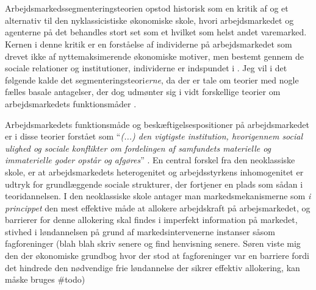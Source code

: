 \section{ \label{AST_overordnet}}

Arbejdsmarkedssegmenteringsteorien opstod historisk som en kritik af og et alternativ til den nyklassicistiske økonomiske skole, hvori arbejdsmarkedet og agenterne på det behandles stort set som et hvilket som helst andet varemarked. Kernen i denne kritik er en forståelse af individerne på arbejdsmarkedet som drevet ikke af nyttemaksimerende økonomiske motiver, men bestemt gennem de sociale relationer og institutioner, individerne er indspundet i \parencite[173]{Boje1986}. Jeg vil i det følgende kalde det segmenteringsteori\emph{erne}, da der er tale om teorier med nogle fælles basale antagelser, der dog udmønter sig i vidt forskellige teorier om arbejdsmarkedets funktionsmåder \parencite[177]{Edwards1979}. 


Arbejdsmarkedets funktionsmåde og beskæftigelsespositioner på arbejdsmarkedet er i disse teorier forstået som “\emph{(...) den vigtigste institution, hvorigennem social ulighed og sociale konflikter om fordelingen af samfundets materielle og immaterielle goder opstår og afgøres}” \parencite[10]{Boje1985}. 
En central forskel fra den neoklassiske skole, er at arbejdsmarkedets heterogenitet og arbejdsstyrkens inhomogenitet er udtryk for grundlæggende sociale strukturer, der fortjener en plads som sådan i teoridannelsen. I den neoklassiske skole antager man markedsmekanismerne som \emph{i princippet} den mest effektive måde at allokere arbejdskraft på arbejsmarkedet, og barrierer for denne allokering skal findes i imperfekt information på markedet, stivhed i løndannelsen på grund af markedsintervenerne instanser såsom fagforeninger (blah blah skriv senere og find henvisning senere. Søren viste mig den der økonomiske grundbog hvor der stod at fagforeninger var en barriere fordi det hindrede den nødvendige frie løndannelse der sikrer effektiv allokering, kan måske bruges \#todo)

